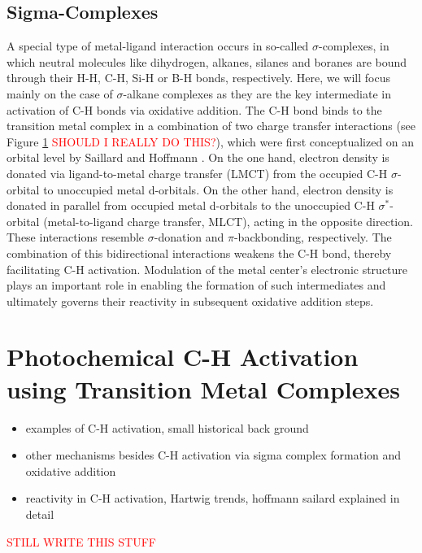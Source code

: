 \subsection{Sigma-Complexes}
\label{subsec:sigma_complexes}
A special type of metal-ligand interaction occurs in so-called $\sigma$-complexes, in which neutral molecules like dihydrogen, alkanes, silanes and boranes are bound through their H-H, C-H, Si-H or B-H bonds, respectively. Here, we will focus mainly on the case of $\sigma$-alkane complexes as they are the key intermediate in activation of C-H bonds via oxidative addition. The C-H bond binds to the transition metal complex in a combination of two charge transfer interactions (see Figure \ref{} \textcolor{red}{SHOULD I REALLY DO THIS?}), which were first conceptualized on an orbital level by Saillard and Hoffmann \cite{saillard1984carbon}. 
On the one hand, electron density is donated via ligand-to-metal charge transfer (LMCT) from the occupied C-H $\sigma$-orbital to unoccupied metal d-orbitals. On the other hand, electron density is donated in parallel from occupied metal d-orbitals to the unoccupied C-H $\sigma^{*}$-orbital (metal-to-ligand charge transfer, MLCT), acting in the opposite direction. These interactions resemble $\sigma$-donation and $\pi$-backbonding, respectively. The combination of this bidirectional interactions weakens the C-H bond, thereby facilitating C-H activation. Modulation of the metal center's electronic structure plays an important role in enabling the formation of such intermediates and ultimately governs their reactivity in subsequent oxidative addition steps.
\section{Photochemical C-H Activation using Transition Metal Complexes}
\begin{itemize}
    \item examples of C-H activation, small historical back ground
    \item other mechanisms besides C-H activation via sigma complex formation and oxidative addition
    \item reactivity in C-H activation, Hartwig trends, hoffmann sailard explained in detail
\end{itemize}
\textcolor{red}{STILL WRITE THIS STUFF}